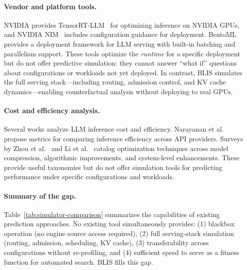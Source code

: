 \documentclass[11pt]{article}
\theoremstyle{plain} %
\theoremstyle{definition} %
\theoremstyle{remark} %
\numberwithin{equation}{section}
\begin{document}
\paragraph{Vendor and platform tools.}
NVIDIA provides TensorRT-LLM~\cite{nvidia2024tensorrtllm} for optimizing inference on NVIDIA GPUs, and NVIDIA NIM~\cite{nvidia2024nim} includes configuration guidance for deployment.
BentoML~\cite{bentoml2024} provides a deployment framework for LLM serving with built-in batching and parallelism support.
These tools optimize the \emph{runtime} for a specific deployment but do not offer predictive simulation: they cannot answer ``what if'' questions about configurations or workloads not yet deployed.
In contrast, BLIS simulates the full serving stack---including routing, admission control, and KV cache dynamics---enabling counterfactual analysis without deploying to real GPUs.

\paragraph{Cost and efficiency analysis.}
Several works analyze LLM inference cost and efficiency.
Narayanan et al.~\cite{narayanan2023cheaply} propose metrics for comparing inference efficiency across API providers.
Surveys by Zhou et al.~\cite{zhou2024efficientinference} and Li et al.~\cite{li2024llmservingsurvey} catalog optimization techniques across model compression, algorithmic improvements, and system-level enhancements.
These provide useful taxonomies but do not offer simulation tools for predicting performance under specific configurations and workloads.

\paragraph{Summary of the gap.}
Table~\ref{tab:simulator-comparison} summarizes the capabilities of existing prediction approaches.
No existing tool simultaneously provides: (1) blackbox operation (no engine source access required), (2) full serving-stack simulation (routing, admission, scheduling, KV cache), (3) transferability across configurations without re-profiling, and (4) sufficient speed to serve as a fitness function for automated search.
BLIS fills this gap.
\end{document}

